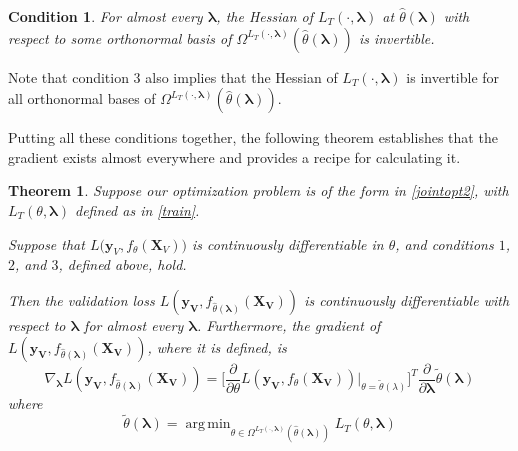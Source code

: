 \documentclass[10pt,letterpaper]{article}
\newtheorem{theorem}{Theorem}
\newtheorem{condition}{Condition}
\DeclareMathOperator*{\argmin}{arg\,min}
\begin{document}
\begin{condition}
For almost every $\boldsymbol{\lambda}$, the Hessian of $L_T\left(\cdot, \boldsymbol{\lambda}\right)$ at $\hat{\theta}\left(\boldsymbol{\lambda}\right)$ with respect to some orthonormal basis of $\Omega^{L_T(\cdot, \boldsymbol{\lambda})}(\hat{\theta}\left(\boldsymbol{\lambda}\right))$ is invertible.

\end{condition}
Note that condition 3 also implies that the Hessian of $L_T \left(\cdot, \boldsymbol{\lambda}\right)$ is invertible for all orthonormal bases of $\Omega^{L_T(\cdot, \boldsymbol{\lambda})}(\hat{\theta}\left(\boldsymbol{\lambda}\right))$.

Putting all these conditions together, the following theorem establishes that the gradient exists almost everywhere and provides a recipe for calculating it.

\begin{theorem}
Suppose our optimization problem is of the form in \eqref{jointopt2}, with $L_T\left(\theta, \boldsymbol{\lambda}\right)$ defined as in \eqref{train}.

Suppose that $L \Big( \boldsymbol{y}_V, f_{\theta}(\boldsymbol{X}_V)\Big)$ is continuously differentiable in $\theta$, and conditions $1$, $2$, and $3$, defined above, hold.

Then the validation loss $L(\boldsymbol{y_V}, f_{\hat \theta(\boldsymbol{\lambda})}(\boldsymbol{X_V}))$ is continuously differentiable with respect to $\boldsymbol{\lambda}$ for almost every $\boldsymbol{\lambda}$. Furthermore, the gradient of $L(\boldsymbol{y_V}, f_{\hat \theta(\boldsymbol{\lambda})}(\boldsymbol{X_V}))$, where it is defined, is
\begin{equation}
\nabla_{\boldsymbol{\lambda}} L(\boldsymbol{y_V}, f_{\hat \theta(\boldsymbol{\lambda})}(\boldsymbol{X_V})) = \Big [ \frac{\partial}{\partial \theta} L(\boldsymbol{y_V}, f_{\theta}(\boldsymbol{X_V})) |_{\theta=\tilde\theta(\lambda)} \Big ]^T \frac{\partial}{\partial \boldsymbol{\lambda}} \tilde{\theta}(\boldsymbol{\lambda})
\end{equation}
where
\begin{equation}
\tilde{\theta}(\boldsymbol{\lambda}) = \argmin_{\theta \in \Omega^{L_T(\cdot, \boldsymbol{\lambda})}(\hat \theta(\boldsymbol{\lambda}))} L_T(\theta , \boldsymbol{\lambda})
\label{restrictedmodelparams}
\end{equation}
\label{thethrm}
\end{theorem}
\end{document}
